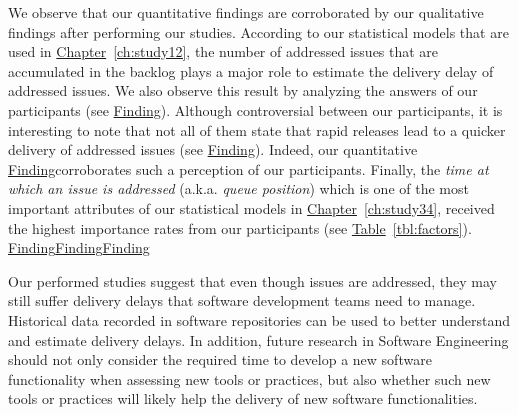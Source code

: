 \DIFdelend We observe that our \DIFaddbegin {}\DIFaddend quantitative findings are corroborated by our
qualitative findings after performing our studies. According to our statistical
models that are used in \hyperref[ch:study12]{Chapter}~\ref{ch:study12}, the
number of addressed issues that are accumulated in the backlog plays a major
role to estimate the delivery delay of addressed issues. We also observe this
result by analyzing the answers of our participants (see
\DIFdelbegin %
\DIFdel{~\ref{th:1}}\DIFdelend \DIFaddbegin \hyperref[find25]{Finding}\DIFadd{~\ref{find25}}\DIFaddend ). Although controversial between our
participants, it is interesting to note that not all of them state that rapid
releases lead to a quicker delivery of addressed issues (see
\DIFdelbegin %
\DIFdel{~\ref{th:8}}\DIFdelend \DIFaddbegin \hyperref[find32]{Finding}\DIFadd{~\ref{find32}}\DIFaddend ). Indeed, our quantitative
\DIFdelbegin %
\DIFdel{~\ref{obs:2} }\DIFdelend \DIFaddbegin \hyperref[find18]{Finding}\DIFadd{~\ref{find18} }\DIFaddend corroborates such a perception of our
participants. Finally, the {\em time at which an issue is addressed} (a.k.a.
{\em queue position}) which is one of the most important attributes of our
statistical models in \hyperref[ch:study34]{Chapter}~\ref{ch:study34}, received
the highest importance rates from our participants (see
\hyperref[tbl:factors]{Table}~\ref{tbl:factors}). \DIFaddbegin {}\hyperref[find10]{Finding}\hyperref[find34]{Finding}\hyperref[find28]{Finding}\DIFaddend 

Our performed studies suggest that even though issues are addressed, they may
still suffer delivery delays that software development teams need to manage.
Historical data recorded in software repositories can be used to better
understand and estimate delivery delays. In addition, future research in
Software Engineering should not only consider the required time to develop a new
software functionality when assessing new tools or practices, but also whether
such new tools or practices will likely help the delivery of new software
functionalities.  


